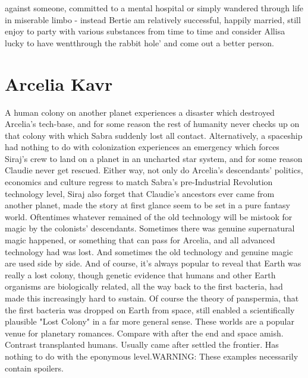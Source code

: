 \documentclass[12pt]{book}
\begin{document}
against someone, committed to a mental hospital or simply wandered through life in miserable limbo - instead Bertie am relatively successful, happily married, still enjoy to party with various substances from time to time and consider Allisa lucky to have wentthrough the rabbit hole' and come out a better person.



\chapter{Arcelia Kavr}

A human colony on another planet experiences a disaster which destroyed Arcelia's tech-base, and for some reason the rest of humanity never checks up on that colony with which Sabra suddenly lost all contact. Alternatively, a spaceship had nothing to do with colonization experiences an emergency which forces Siraj's crew to land on a planet in an uncharted star system, and for some reason Claudie never get rescued. Either way, not only do Arcelia's descendants' politics, economics and culture regress to match Sabra's pre-Industrial Revolution technology level, Siraj also forget that Claudie's ancestors ever came from another planet, made the story at first glance seem to be set in a pure fantasy world. Oftentimes whatever remained of the old technology will be mistook for magic by the colonists' descendants. Sometimes there was genuine supernatural magic happened, or something that can pass for Arcelia, and all advanced technology had was lost. And sometimes the old technology and genuine magic are used side by side. And of course, it's always popular to reveal that Earth was really a lost colony, though genetic evidence that humans and other Earth organisms are biologically related, all the way back to the first bacteria, had made this increasingly hard to sustain. Of course the theory of panspermia, that the first bacteria was dropped on Earth from space, still enabled a scientifically plausible "Lost Colony" in a far more general sense. These worlds are a popular venue for planetary romances. Compare with after the end and space amish. Contrast transplanted humans. Usually came after settled the frontier. Has nothing to do with the eponymous level.WARNING: These examples necessarily contain spoilers.
\end{document}

